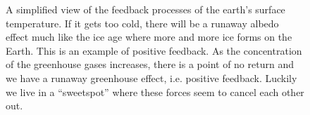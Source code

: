     \begin{figure}[hb]
    \centering
    \caption{A simplified view of the feedback processes of the earth's surface temperature. If it gets too cold, there will be a runaway albedo effect much like the ice age where more and more ice forms on the Earth. This is an example of positive feedback. As the concentration of the greenhouse gases increases, there is a point of no return and we have a runaway greenhouse effect, i.e. positive feedback. Luckily we live in a ``sweetspot'' where these forces seem to cancel each other out. }
    \label{fig:earth_stability}
    \end{figure}

